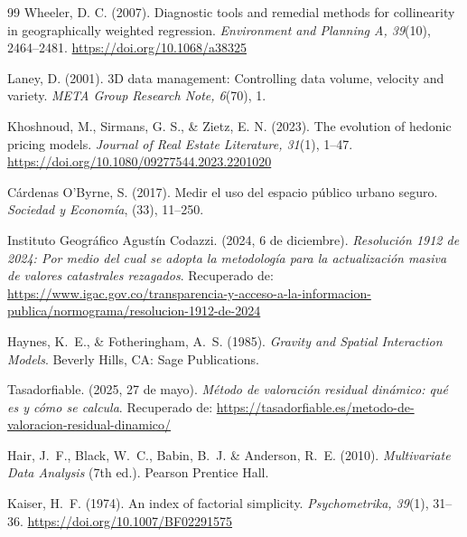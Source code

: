 \documentclass[12pt, a4paper, twoside, openright]{report}
\theoremstyle{plain}
\theoremstyle{definition}
\begin{document}
\begin{thebibliography}{99}
Wheeler, D. C. (2007).
Diagnostic tools and remedial methods for collinearity in geographically weighted regression.
\textit{Environment and Planning A, 39}(10), 2464--2481.
\href{https://doi.org/10.1068/a38325}{https://doi.org/10.1068/a38325}

Laney, D. (2001).
3D data management: Controlling data volume, velocity and variety.
\textit{META Group Research Note, 6}(70), 1.


Khoshnoud, M., Sirmans, G. S., \& Zietz, E. N. (2023).
The evolution of hedonic pricing models.
\textit{Journal of Real Estate Literature, 31}(1), 1--47.
\href{https://doi.org/10.1080/09277544.2023.2201020}{https://doi.org/10.1080/09277544.2023.2201020}

Cárdenas O’Byrne, S. (2017).
Medir el uso del espacio público urbano seguro.
\textit{Sociedad y Economía}, (33), 11--250.

Instituto Geográfico Agustín Codazzi. (2024, 6 de diciembre).
\textit{Resolución 1912 de 2024: Por medio del cual se adopta la metodología para la actualización masiva de valores catastrales rezagados}.
Recuperado de: \url{https://www.igac.gov.co/transparencia-y-acceso-a-la-informacion-publica/normograma/resolucion-1912-de-2024}

Haynes, K.~E., \& Fotheringham, A.~S. (1985).
\textit{Gravity and Spatial Interaction Models}.
Beverly Hills, CA: Sage Publications.

Tasadorfiable. (2025, 27 de mayo).
\textit{Método de valoración residual dinámico: qué es y cómo se calcula}.
Recuperado de: \url{https://tasadorfiable.es/metodo-de-valoracion-residual-dinamico/}


Hair, J.~F., Black, W.~C., Babin, B.~J. \& Anderson, R.~E. (2010).
\textit{Multivariate Data Analysis} (7th ed.).
Pearson Prentice Hall.

Kaiser, H.~F. (1974).
An index of factorial simplicity.
\textit{Psychometrika, 39}(1), 31--36.
\href{https://doi.org/10.1007/BF02291575}{https://doi.org/10.1007/BF02291575}


\end{thebibliography}
\end{document}
